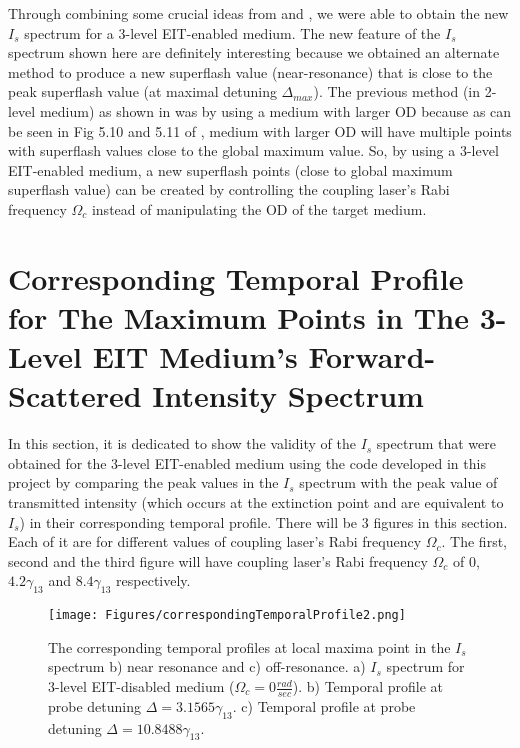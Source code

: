 Through combining some crucial ideas from \cite{Kwong2014} and \cite{jeong2010slow}, we were able to obtain the new $I_{s}$ spectrum for a 3-level EIT-enabled medium. The new feature of the $I_{s}$ spectrum shown here are definitely interesting because we obtained an alternate method to produce a new superflash value (near-resonance) that is close to the peak superflash value (at maximal detuning $\Delta_{max}$). The previous method (in 2-level medium) as shown in \cite{Kwong2017} was by using a medium with larger OD because as can be seen in Fig 5.10 and 5.11 of \cite{Kwong2017}, medium with larger OD will have multiple points with superflash values close to the global maximum value. So, by using a 3-level EIT-enabled medium, a new superflash points (close to global maximum superflash value) can be created by controlling the coupling laser's Rabi frequency $\Omega_{c}$ instead of manipulating the OD of the target medium.


\section{Corresponding Temporal Profile for The Maximum Points in The 3-Level EIT Medium's Forward-Scattered Intensity Spectrum}

In this section, it is dedicated to show the validity of the $I_{s}$ spectrum that were obtained for the 3-level EIT-enabled medium using the code developed in this project by comparing the peak values in the $I_{s}$ spectrum with the peak value of transmitted intensity (which occurs at the extinction point and are equivalent to $I_{s}$) in their corresponding temporal profile. There will be 3 figures in this section. Each of it are for different values of coupling laser's Rabi frequency $\Omega_{c}$. The first, second and the third figure will have coupling laser's Rabi frequency $\Omega_{c}$ of $0$, $4.2\gamma_{13}$ and $8.4\gamma_{13}$ respectively.

\newpage

\begin{figure}[h!]
    \centering
    \texttt{[image: Figures/correspondingTemporalProfile2.png]}
    \caption{The corresponding temporal profiles at local maxima point in the $I_{s}$ spectrum b) near resonance and c) off-resonance. a) $I_{s}$ spectrum for 3-level EIT-disabled medium ($\Omega_{c} = 0 \frac{rad}{sec}$). b)  Temporal profile at probe detuning $\Delta = 3.1565\gamma_{13}$. c) Temporal profile at probe detuning $\Delta = 10.8488\gamma_{13}$.}
    \label{fig: corresponding temporal profile 1}
\end{figure}

